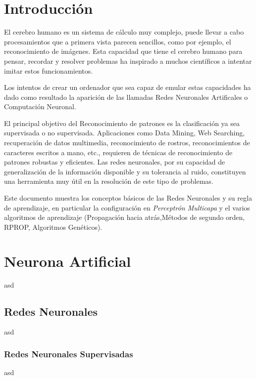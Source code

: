 \documentclass[12pt]{article}
\title{}
\newcounter{subsubsubsection}[subsubsection]
\begin{document}
\tableofcontents

\section{Introducción}

El cerebro humano es un sistema de cálculo muy complejo, puede llevar a cabo procesamientos que a primera vista parecen sencillos, como por ejemplo, el reconocimiento de imágenes. Esta capacidad que tiene el cerebro humano para pensar, recordar y resolver problemas ha inspirado a muchos científicos a intentar imitar estos funcionamientos.\hfill \break

Los intentos de crear un ordenador que sea capaz de emular estas capacidades ha dado como resultado la aparición de las llamadas Redes Neuronales Artificales o Computación Neuronal.\hfill \break

El principal objetivo del Reconocimiento de patrones es la clasificación ya sea supervisada o no supervisada. Aplicaciones como Data Mining, Web Searching, recuperación de datos multimedia, reconocimiento de rostros, reconocimientos de caracteres escritos a mano, etc., requieren de técnicas de reconocimiento de patrones robustas y eficientes.
Las redes neuronales, por su capacidad de generalización de la información disponible y su tolerancia al ruido, constituyen una herramienta muy útil en la resolución de este tipo de problemas.\cite{patterRecognition}\hfill \break

Este documento muestra los conceptos básicos de las Redes Neuronales y su regla de aprendizaje, en particular la configuración en \textit{Perceptrón Multicapa} y el varios algoritmos de aprendizaje (Propagación hacia atrás,Métodos de segundo orden, RPROP, Algoritmos Genéticos).


\clearpage

\section{Neurona Artificial}
asd

\subsection{Redes Neuronales}
asd

\subsubsection{Redes Neuronales Supervisadas}
asd
\end{document}
